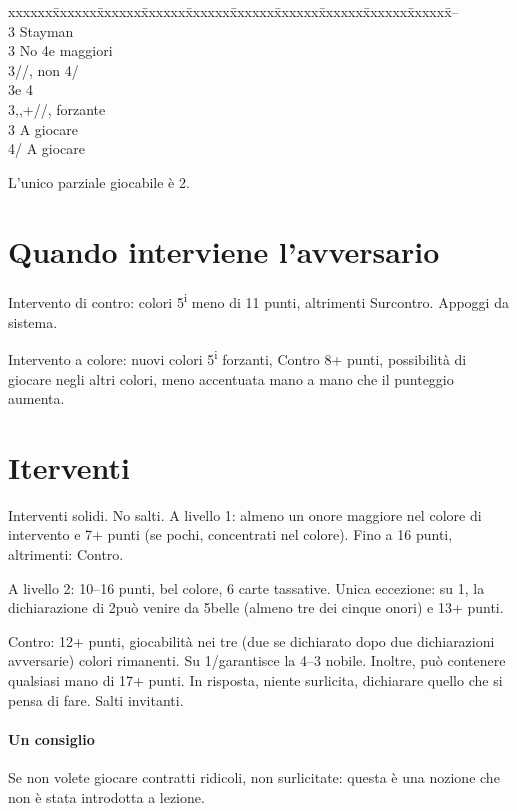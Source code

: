 \documentclass[a4paper,italian,12pt]{article}
\newcommand\SA{{\smaller{SA}}\xspace}
\newenvironment{bidtable}
{\begin{tabbing}

    xxxxxx\=xxxxxx\=xxxxxx\=xxxxxx\=xxxxxx\=xxxxxx\=xxxxxx\=xxxxxx\=xxxxxx\=xxxxxx\=\kill}
{\end{tabbing} }%
\begin{document}
\begin{bidtable}
    2\SA--\+\\
    3\Cl\>\> Stayman\+\+\\
    3\Di\> No 4e maggiori\\
    3\He/\Sp {}\He/\Sp, non 4\Sp/\He\\
    3\SA {}\He e 4\Sp\-\-\\
    3\Di,\He,\Sp \>+\Di/\He/\Sp, forzante\\
    3\SA \>\> A giocare\\
    4\He/\Sp \>\> A giocare
\end{bidtable}
L'unico parziale giocabile è 2\SA.

\section*{Quando interviene l'avversario}
Intervento di contro: colori 5\textsuperscript{i} meno di 11 punti, altrimenti Surcontro. Appoggi da sistema.

Intervento a colore: nuovi colori 5\textsuperscript{i} forzanti, Contro 8+ punti, possibilità di giocare negli altri
colori, meno accentuata mano a mano che il punteggio aumenta.

\section*{Iterventi}
Interventi solidi. No salti. A livello 1: almeno un onore maggiore nel colore di intervento e 7+ punti (se pochi, concentrati nel
colore). Fino a 16 punti, altrimenti: Contro.

A livello 2: 10--16 punti, bel colore, 6 carte tassative. Unica eccezione: su 1\Sp, la dichiarazione di 2\He può venire
da 5\He belle (almeno tre dei cinque onori) e 13+ punti.

Contro: 12+ punti, giocabilità nei tre (due se dichiarato dopo due dichiarazioni avversarie) colori rimanenti. Su
1\Cl/\Di garantisce la 4--3 nobile. Inoltre, può contenere qualsiasi mano
di 17+ punti. In risposta, niente surlicita, dichiarare quello che si pensa di fare. Salti invitanti.

\paragraph{Un consiglio} Se non volete giocare contratti ridicoli, non surlicitate: questa è una nozione che non è stata
introdotta a lezione.
\end{document}
